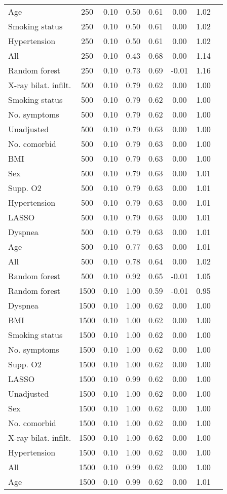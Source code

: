\documentclass{article}
\begin{document}
{\begin{longtable}{lccccccc}
Age & 250 & 0.10 & 0.50 & 0.61 &  0.00 & 1.02 \\ 
Smoking status & 250 & 0.10 & 0.50 & 0.61 &  0.00 & 1.02 \\ 
Hypertension & 250 & 0.10 & 0.50 & 0.61 &  0.00 & 1.02 \\ 
All & 250 & 0.10 & 0.43 & 0.68 &  0.00 & 1.14 \\ 
Random forest & 250 & 0.10 & 0.73 & 0.69 & -0.01 & 1.16 \\ \midrule() 
X-ray bilat. infilt. & 500 & 0.10 & 0.79 & 0.62 &  0.00 & 1.00 \\ 
Smoking status & 500 & 0.10 & 0.79 & 0.62 &  0.00 & 1.00 \\ 
No. symptoms & 500 & 0.10 & 0.79 & 0.62 &  0.00 & 1.00 \\ 
Unadjusted & 500 & 0.10 & 0.79 & 0.63 &  0.00 & 1.00 \\ 
No. comorbid & 500 & 0.10 & 0.79 & 0.63 &  0.00 & 1.00 \\ 
BMI & 500 & 0.10 & 0.79 & 0.63 &  0.00 & 1.00 \\ 
Sex & 500 & 0.10 & 0.79 & 0.63 &  0.00 & 1.01 \\ 
Supp. O2 & 500 & 0.10 & 0.79 & 0.63 &  0.00 & 1.01 \\ 
Hypertension & 500 & 0.10 & 0.79 & 0.63 &  0.00 & 1.01 \\ 
LASSO & 500 & 0.10 & 0.79 & 0.63 &  0.00 & 1.01 \\ 
Dyspnea & 500 & 0.10 & 0.79 & 0.63 &  0.00 & 1.01 \\ 
Age & 500 & 0.10 & 0.77 & 0.63 &  0.00 & 1.01 \\ 
All & 500 & 0.10 & 0.78 & 0.64 &  0.00 & 1.02 \\ 
Random forest & 500 & 0.10 & 0.92 & 0.65 & -0.01 & 1.05 \\ \midrule() 
Random forest & 1500 & 0.10 & 1.00 & 0.59 & -0.01 & 0.95 \\ 
Dyspnea & 1500 & 0.10 & 1.00 & 0.62 &  0.00 & 1.00 \\ 
BMI & 1500 & 0.10 & 1.00 & 0.62 &  0.00 & 1.00 \\ 
Smoking status & 1500 & 0.10 & 1.00 & 0.62 &  0.00 & 1.00 \\ 
No. symptoms & 1500 & 0.10 & 1.00 & 0.62 &  0.00 & 1.00 \\ 
Supp. O2 & 1500 & 0.10 & 1.00 & 0.62 &  0.00 & 1.00 \\ 
LASSO & 1500 & 0.10 & 0.99 & 0.62 &  0.00 & 1.00 \\ 
Unadjusted & 1500 & 0.10 & 1.00 & 0.62 &  0.00 & 1.00 \\ 
Sex & 1500 & 0.10 & 1.00 & 0.62 &  0.00 & 1.00 \\ 
No. comorbid & 1500 & 0.10 & 1.00 & 0.62 &  0.00 & 1.00 \\ 
X-ray bilat. infilt. & 1500 & 0.10 & 1.00 & 0.62 &  0.00 & 1.00 \\ 
Hypertension & 1500 & 0.10 & 1.00 & 0.62 &  0.00 & 1.00 \\ 
All & 1500 & 0.10 & 0.99 & 0.62 &  0.00 & 1.00 \\ 
Age & 1500 & 0.10 & 0.99 & 0.62 &  0.00 & 1.01 \\
\bottomrule
\hline
\end{longtable}
}
\end{document}
